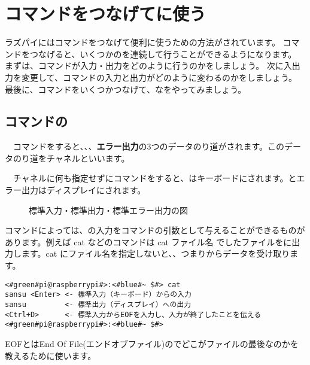 \newpage
\section{コマンドをつなげてに使う}
ラズパイにはコマンドをつなげて便利に使うための方法がされています。
コマンドをつなげると、いくつかのを連続して行うことができるようになります。
まずは、コマンドが入力・出力をどのように行うのかをしましょう。
次に入出力を変更して、コマンドの入力と出力がどのように変わるのかをしましょう。
最後に、コマンドをいくつかつなげて、なをやってみましょう。

\subsection{コマンドの}
　コマンドをすると、{\bf {}}、{\bf {}}、{\bf {}エラー出力}の3つのデータのり道がされます。このデータのり道をチャネルといいます。

　チャネルに何も指定せずにコマンドをすると、はキーボードにされます。とエラー出力はディスプレイにされます。

\begin{figure}
    \centering
    
    \caption{標準入力・標準出力・標準エラー出力の図}
    \label{ch03:stdioerr}
\end{figure}

コマンドによっては、の入力をコマンドの引数として与えることができるものがあります。例えば cat などのコマンドは cat ファイル名 でしたファイルをに出力します。cat にファイル名を指定しないと、、つまりからデータを受け取ります。

\begin{lstlisting}[caption=catの標準入力・標準出力, label=stdioCat]
<#green#pi@raspberrypi#>:<#blue#~ $#> cat 
sansu <Enter> <- 標準入力（キーボード）からの入力
sansu         <- 標準出力（ディスプレイ）への出力
<Ctrl+D>      <- 標準入力からEOFを入力し、入力が終了したことを伝える
<#green#pi@raspberrypi#>:<#blue#~ $#>
\end{lstlisting}
EOFとはEnd Of File(エンドオブファイル)のでどこがファイルの最後なのかを教えるために使います。


